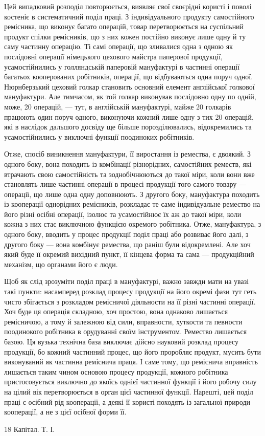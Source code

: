 \parcont{}  %
Цей випадковий розподіл повторюється, виявляє свої своєрідні
користі і поволі костеніє в систематичний поділ праці. З індивідуального
продукту самостійного ремісника, що виконує багато
операцій, товар перетворюється на суспільний продукт спілки
ремісників, що з них кожен постійно виконує лише одну й ту
саму частинну операцію. Ті самі операції, що зливалися одна
з одною як послідовні операції німецького цехового майстра
паперової продукції, усамостійнились у голляндській паперовій
мануфактурі в частинні операції багатьох кооперованих робітників,
операції, що відбуваються одна поруч одної. Нюрнберзький
цеховий голкар становить основний елемент англійської голкової
мануфактури. Але тимчасом, як той голкар виконував послідовно
одну по одній, може, 20 операцій, — тут, в англійській мануфактурі,
майже 20 голкарів працюють один поруч одного, виконуючи
кожний лише одну з тих 20 операцій, які в наслідок дальшого
досвіду ще більше порозділювались, відокремились та усамостійнились
у виключні функції поодиноких робітників.

Отже, спосіб виникнення мануфактури, її виростання із ремества,
є двоякий. З одного боку, вона походить із комбінації
різнорідних, самостійних реместв, які втрачають свою самостійність
та зоднобічнюються до такої міри, коли вони вже становлять
лише частинні операції в процесі продукції того самого товару —
операції, що лише одна одну доповнюють. З другого боку, мануфактура
походить із кооперації однорідних ремісників, розкладає
те саме індивідуальне ремество на його різні осібні операції,
ізолює та усамостійнює їх аж до такої міри, коли кожна з них
стає виключною функцією окремого робітника. Отже, мануфактура,
з одного боку, вводить у процес продукції поділ праці
або розвиває його далі, з другого боку — вона комбінує ремества,
що раніш були відокремлені. Але хоч який буде її окремий вихідний
пункт, її кінцева форма та сама — продукційний механізм,
що органами його є люди.

Щоб як слід зрозуміти поділ праці в мануфактурі, важно
завжди мати на увазі такі пункти: насамперед розклад процесу
продукції на його окремі фази тут геть чисто збігається з розкладом
ремісничої діяльности на її різні частинні операції. Хоч буде
ця операція складною, хоч простою, вона однаково лишається
ремісничою, а тому й залежною від сили, вправности, хуткости
та певности поодинокого робітника в орудуванні своїм інструментом.
Ремество лишається базою. Ця вузька технічна база
виключає дійсно науковий розклад процесу продукції, бо кожний
частинний процес, що його проробляє продукт, мусить бути
виконуваний як частинна реміснича праця. І саме тому, що реміснича
вправність лишається таким чином основою процесу продукції,
кожного робітника пристосовується виключно до якоїсь
однієї частинної функції і його робочу силу на цілий вік перетворюється
в орган цієї частинної функції. Нарешті, цей поділ праці
є осібний рід кооперації, а деякі її користі походять із загальної
природи кооперації, а не з цієї осібної форми її.

18 Капітал. Т. І.
